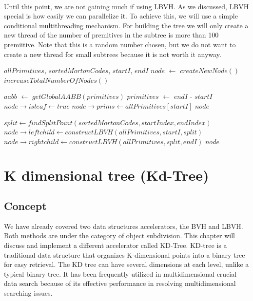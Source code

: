 \documentclass[11pt,a4paper]{article}
\begin{document}
\noindent
\\
Until this point, we are not gaining much if using LBVH. As we discussed, LBVH special is how easily we can parallelize it. To achieve this, we will use a simple conditional multithreading mechanism. For building the tree we will only create a new thread of the number of premitives in the subtree is more than 100 premiitive. Note that this is a random number chosen, but we do not want to create a new thread for small subtrees because it is not worth it anyway.

\begin{algorithm}[H]
\caption{$constructLBVH$}\label{alg:alg1}
\begin{algorithmic}
		\Require $allPrimitives$, $sortedMortonCodes$, $startI$, $endI$
\State $node$ $\gets$ $createNewNode()$
\State $increaseTotalNumberOfNodes()$

\State $aabb$ $\gets$ $getGlobalAABB(primitives)$
\State $primitives$ $\gets$  $endI$ - $startI$
	\State $node \rightarrow isleaf \gets true$
	\State $node \rightarrow prims \gets allPrimitives[startI]$
	\State \Return $node$
\EndIf

\State $split \gets findSplitPoint(sortedMortonCodes, startIndex, endIndex)$
\State $node \rightarrow leftchild  \gets constructLBVH(allPrimitives, startI, split)$
\State $node \rightarrow rightchild  \gets constructLBVH(allPrimitives, split, endI)$
\State \Return $node$
\end{algorithmic}
\end{algorithm}
\clearpage



\section{K dimensional tree (Kd-Tree)}
\subsection{Concept}
We have already covered two data structures accelerators, the BVH and LBVH. Both methods are under the category of object subdivision. This chapter will discuss and implement a different accelerator called KD-Tree.
KD-tree is a traditional data structure that organizes K-dimensional points into a binary tree for easy retrieval. The KD tree can have several dimensions at each level, unlike a typical binary tree. It has been frequently utilized in multidimensional crucial data search because of its effective performance in resolving multidimensional searching issues.
\end{document}
